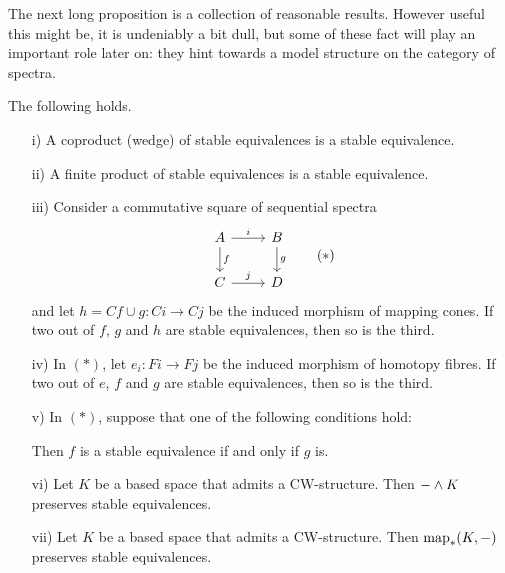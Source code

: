 The next long proposition is a collection of reasonable results. However useful this might be, it is undeniably a bit dull, but some of these fact will play an important role later on: they hint towards a model structure on the category of spectra.

\begin{proposition}\label{proposition:preservation-of-stable-equivalences}
The following holds.
\begin{itemize}
    \item[i)] A coproduct (wedge) of stable equivalences is a stable equivalence.
    \item[ii)] A finite product of stable equivalences is a stable equivalence.
    \item[iii)] Consider a commutative square of sequential spectra
    \[
    \begin{tikzcd}
    A \ar[d,"f"] \ar[r,"i"] & B \ar[d,"g"]\\
    C \ar[r,"j"] & D
    \end{tikzcd}\tag{$*$}
    \]
    and let $h=Cf\cup g:Ci\to Cj$ be the induced morphism of mapping cones. If two out of $f$, $g$ and $h$ are stable equivalences, then so is the third.
    \item[iv)] In $(*)$, let $e_i:Fi\to Fj$ be the induced morphism of homotopy fibres. If two out of $e$, $f$ and $g$ are stable equivalences, then so is the third.
    \item[v)] In $(*)$, suppose that one of the following conditions hold:
    Then $f$ is a stable equivalence if and only if $g$ is.
    \item[vi)] Let $K$ be a based space that admits a CW-structure. Then $-\wedge K$ preserves stable equivalences.
    \item[vii)] Let $K$ be a based space that admits a  CW-structure. Then $\operatorname{map}_*(K,-)$ preserves stable equivalences.
\end{itemize}
\end{proposition}

